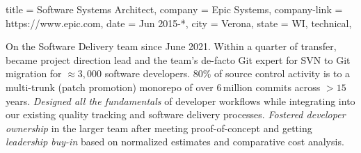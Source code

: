 \begin{position}
  {
    title   = Software Systems Architect,
    company = Epic Systems,
    company-link = https://www.epic.com,
    date    = Jun 2015-*,
    city    = Verona,
    state   = WI,
    technical,
  }

  On the Software Delivery team since June 2021. Within a quarter of
  transfer, became project direction lead and the team's de-facto Git
  expert for SVN to Git migration for $\approx 3,000$ software
  developers. 80\% of source control activity is to a multi-trunk
  (patch promotion) monorepo of over 6\,million commits across $>15$
  years.
  \emph{Designed all the fundamentals} of developer workflows while
  integrating into our existing quality tracking and software delivery
  processes. \emph{Fostered developer ownership} in the larger team
  after meeting proof-of-concept and getting \emph{leadership buy-in}
  based on normalized estimates and comparative cost analysis.

  \medskip


\end{position}
